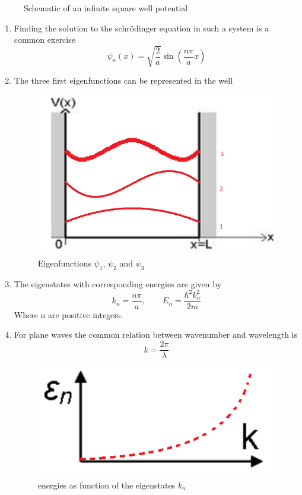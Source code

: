 \documentclass[12pt,a4paper]{article}
\begin{document}
\begin{enumerate}
\begin{figure}
			\caption{Schematic of an infinite square well potential}
			\label{fig:well}
		\end{figure}
		
		\begin{enumerate}
			\item Finding the solution to the schrödinger equation in such a system is a common exercise
			$$\psi_n(x) = \sqrt{\frac{2}{a}}\sin(\frac{n\pi}{a}x) $$

			\item The three first eigenfunctions can be represented in the well
			\begin{figure}[h]
			\centering
			\includegraphics[width=0.7\linewidth]{wellWave}
			\caption{Eigenfunctions $\psi_1$, $\psi_2$ and $\psi_3$}
			\label{fig:wellwave}
			\end{figure}
		
			\item The eigenstates with corresponding energies are given by
			$$ k_n = \frac{n\pi}{a},\qquad E_n = \frac{\hbar^2k_n^2}{2m} $$
			Where n are positive integers.
			\item For plane waves the common relation between wavenumber and wavelength is
			$$k = \frac{2\pi}{\lambda}$$
			\begin{figure}[h]
				\centering
				\includegraphics[width=0.7\linewidth]{e(k)Plot}
				\caption{energies as function of the eigenstates $k_n$}
				\label{fig:ekplot}
			\end{figure}
			
		\end{enumerate}
		
	\end{enumerate}
\end{document}
